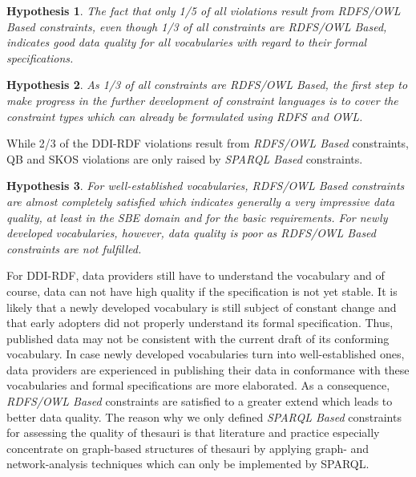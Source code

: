 \documentclass[conference]{IEEEtran}
\newcommand{\tb}[1]{\todo[size=\small, color=green!40]{\textbf{Thomas:} #1}}
\newtheorem{hyp}{Hypothesis}
\begin{document}
\begin{hyp}
The fact that only 1/5 of all violations result from RDFS/OWL Based constraints, even though 1/3 of all constraints are RDFS/OWL Based, indicates good data quality for all vocabularies with regard to their formal specifications.
\end{hyp}

\begin{hyp}
As 1/3 of all constraints are RDFS/OWL Based, the first step to make progress in the further development of constraint languages is to cover the constraint types which can already be formulated using RDFS and OWL.
\end{hyp} 

While 2/3 of the DDI-RDF violations result from \emph{RDFS/OWL Based} constraints,
QB and SKOS violations are only raised by \emph{SPARQL Based} constraints.

\begin{hyp}
For well-established vocabularies, RDFS/OWL Based constraints are almost completely satisfied which indicates generally a very impressive data quality, at least in the SBE domain and for the basic requirements. For newly developed vocabularies, however, data quality is poor as RDFS/OWL Based constraints are not fulfilled. 
\end{hyp}

For DDI-RDF, data providers still have to understand the vocabulary and of course, data can not have high quality if the specification is not yet stable.
It is likely that a newly developed vocabulary is still subject of constant change
and that early adopters did not properly understand its formal specification.
Thus, published data may not be consistent with the current draft of its conforming vocabulary.
In case newly developed vocabularies turn into well-established ones,
data providers are experienced in publishing their data in conformance with these vocabularies
and formal specifications are more elaborated. 
As a consequence, \emph{RDFS/OWL Based} constraints are satisfied to a greater extend which leads to better data quality.  
%
The reason why we only defined \emph{SPARQL Based} constraints for assessing the quality of thesauri is that literature and practice especially concentrate on graph-based structures of thesauri by applying graph- and network-analysis techniques which can only be implemented by SPARQL.
\end{document}
